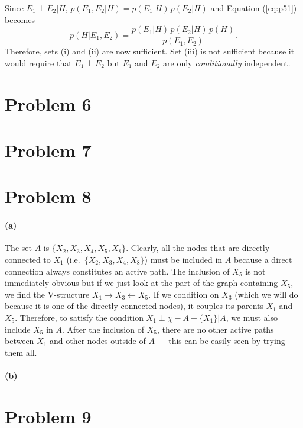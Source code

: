 \documentclass[11pt]{article}
\newcommand{\eq}[1]{Equation (\ref{eq:#1})}
\newcommand{\pr}[1]{\ensuremath{p(#1)}}
\begin{document}
Since $E_1 \perp E_2 | H$, $\pr{E_1, E_2|H} = \pr{E_1|H}\,\pr{E_2|H}$ and
\eq{p51} becomes
\begin{equation}
    \pr{H | E_1,E_2} = \frac{\pr{E_1|H}\, \pr{E_2|H} \, \pr{H}}{\pr{E_1,E_2}}.
\end{equation}
Therefore, sets (i) and (ii) are now sufficient. Set (iii) is not sufficient
because it would require that $E_1 \perp E_2$ but $E_1$ and $E_2$ are only
\emph{conditionally} independent.

\section{Problem 6}

\section{Problem 7}

\section{Problem 8}

\paragraph{(a)}

The set $A$ is $\{ X_2, X_3, X_4, X_5, X_8 \}$. Clearly, all the nodes
that are directly connected to $X_1$ (i.e.~$\{ X_2, X_3, X_4, X_8 \}$) must
be included in $A$ because a direct connection always constitutes an active
path. The inclusion of $X_5$ is not immediately obvious but if we just look
at the part of the graph containing $X_5$, we find the V-structure
$X_1 \to X_3 \gets X_5$. If we condition on $X_3$ (which we will do because
it is one of the directly connected nodes), it couples its parents $X_1$
and $X_5$.  Therefore, to satisfy the condition $X_1 \perp \chi-A-\{X_1\}|A$,
we must also include $X_5$ in $A$.  After the inclusion of $X_5$, there are
no other active paths between $X_1$ and other nodes outside of $A$ --- this
can be easily seen by trying them all.

\paragraph{(b)}

\section{Problem 9}
\end{document}
